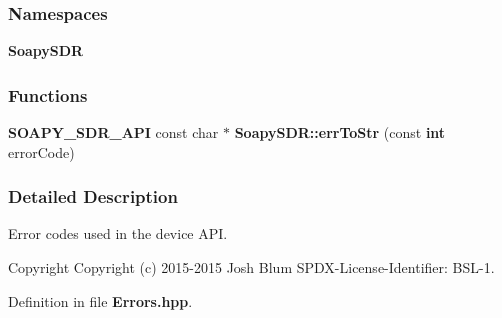 \subsubsection*{Namespaces}
\begin{DoxyCompactItemize}
\item 
 {\bf Soapy\+S\+DR}
\end{DoxyCompactItemize}
\subsubsection*{Functions}
\begin{DoxyCompactItemize}
\item 
{\bf S\+O\+A\+P\+Y\+\_\+\+S\+D\+R\+\_\+\+A\+PI} const char $\ast$ {\bf Soapy\+S\+D\+R\+::err\+To\+Str} (const {\bf int} error\+Code)
\end{DoxyCompactItemize}


\subsubsection{Detailed Description}
Error codes used in the device A\+PI. 

\begin{DoxyCopyright}{Copyright}
Copyright (c) 2015-\/2015 Josh Blum S\+P\+D\+X-\/\+License-\/\+Identifier\+: B\+S\+L-\/1. 
\end{DoxyCopyright}


Definition in file {\bf Errors.\+hpp}.

